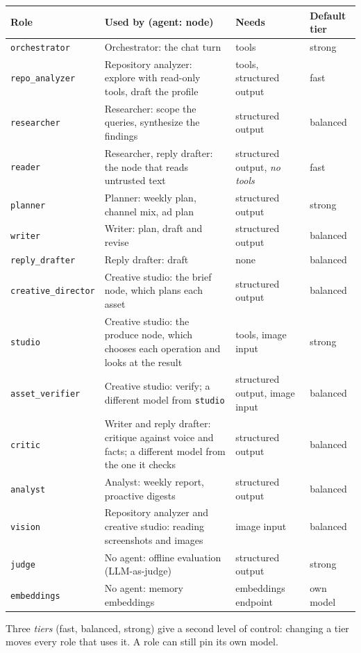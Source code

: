 \documentclass[11pt,a4paper]{article}
\begin{document}
\begin{longtable}{@{}p{3.0cm}p{6.3cm}p{3.5cm}p{1.9cm}@{}}
\toprule
\textbf{Role} & \textbf{Used by (agent: node)} & \textbf{Needs} & \textbf{Default tier}\\
\midrule
\endhead
\texttt{orchestrator} & Orchestrator: the chat turn & tools & strong\\
\texttt{repo\_analyzer} & Repository analyzer: explore with read-only tools, draft the profile & tools, structured output & fast\\
\texttt{researcher} & Researcher: scope the queries, synthesize the findings & structured output & balanced\\
\texttt{reader} & Researcher, reply drafter: the node that reads untrusted text & structured output, \emph{no tools} & fast\\
\texttt{planner} & Planner: weekly plan, channel mix, ad plan & structured output & strong\\
\texttt{writer} & Writer: plan, draft and revise & structured output & balanced\\
\texttt{reply\_drafter} & Reply drafter: draft & none & balanced\\
\texttt{creative\_director} & Creative studio: the brief node, which plans each asset & structured output & balanced\\
\texttt{studio} & Creative studio: the produce node, which chooses each operation and looks at the result & tools, image input & strong\\
\texttt{asset\_verifier} & Creative studio: verify; a different model from \texttt{studio} & structured output, image input & balanced\\
\texttt{critic} & Writer and reply drafter: critique against voice and facts; a different model from the one it checks & structured output & balanced\\
\texttt{analyst} & Analyst: weekly report, proactive digests & structured output & balanced\\
\texttt{vision} & Repository analyzer and creative studio: reading screenshots and images & image input & balanced\\
\texttt{judge} & No agent: offline evaluation (LLM-as-judge) & structured output & strong\\
\texttt{embeddings} & No agent: memory embeddings & embeddings endpoint & own model\\
\bottomrule
\end{longtable}

Three \emph{tiers} (fast, balanced, strong) give a second level of control: changing a tier moves every role that uses it. A role can still pin its own model.
\end{document}
